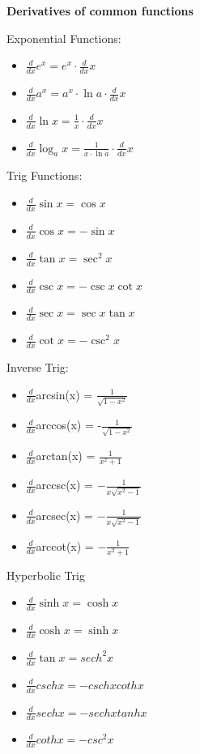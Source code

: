 \documentclass{report}
\begin{document}
    \bigbreak \noindent \bigbreak \noindent 
    \begin{large}
      \textbf{Derivatives of common functions}
    \end{large}
    \bigbreak \noindent 
    Exponential Functions:
    \begin{itemize}
      \item $\frac{d}{dx}e^{x} = e^{x} \cdot \frac{d}{dx}x$
      \item $\frac{d}{dx}a^{x} = a^{x} \cdot \ln{a} \cdot \frac{d}{dx}x$
      \item $\frac{d}{dx}\ln{x}  = \frac{1}{x} \cdot \frac{d}{dx}x$
      \item $\frac{d}{dx}\log_a{x} = \frac{1}{x \cdot \ln{a}} \cdot \frac{d}{dx}x$
    \end{itemize}
    \bigbreak \noindent \bigbreak \noindent
    Trig Functions:
    \begin{itemize}
      \item $\frac{d}{dx}\sin{x}  = \cos{x}$
      \item $\frac{d}{dx}\cos{x}  = -\sin{x}$
      \item $\frac{d}{dx}\tan{x} = \sec^{2}{x} $
      \item $\frac{d}{dx}\csc{x} = -\csc{x}\cot{x} $
      \item $\frac{d}{dx}\sec{x} = \sec{x}\tan{x} $
      \item $\frac{d}{dx}\cot{x} = -\csc^{2}{x} $
    \end{itemize}
    \bigbreak \noindent \bigbreak \noindent
    Inverse Trig:
    \begin{itemize}
      \item $\frac{d}{dx}$arcsin(x) = $\frac{1}{\sqrt{1-x^{2}}}$
      \item $\frac{d}{dx}$arccos(x) = -$\frac{1}{\sqrt{1-x^{2}}}$
      \item $\frac{d}{dx}$arctan(x) = $\frac{1}{x^{2}+1}$
      \item $\frac{d}{dx}$arccsc(x) = $-\frac{1}{x\sqrt{x^{2}-1}}$
      \item $\frac{d}{dx}$arcsec(x) = $-\frac{1}{x\sqrt{x^{2}-1}}$
      \item $\frac{d}{dx}$arccot(x) = $-\frac{1}{x^{2}+1}$
    \end{itemize}

    \pagebreak \bigbreak \noindent
    \bigbreak \noindent \bigbreak \noindent
    Hyperbolic Trig
    \begin{itemize}
      \item $\frac{d}{dx}\sinh{x}  = \cosh{x}$
      \item $\frac{d}{dx}\cosh{x} = \sinh{x}$
      \item $\frac{d}{dx}\tan{x} = sech^{2}x$
      \item $\frac{d}{dx}csch{x} = -csch{x}cothx$
      \item $\frac{d}{dx}sech{x} = -sechxtanhx$
      \item $\frac{d}{dx}coth{x} = -csc^{2}x$
    \end{itemize}
\end{document}
